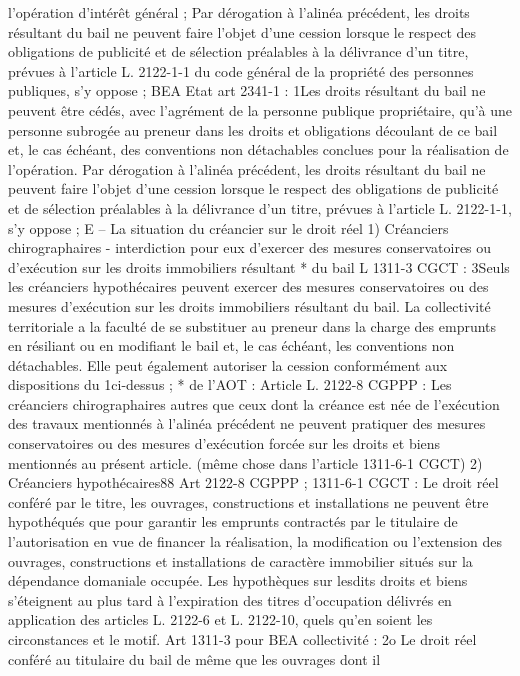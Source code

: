 \documentclass[11pt,a4paper]{report}
\begin{document}
l'opération d'intérêt général ;
Par dérogation à l'alinéa précédent, les droits résultant du bail ne peuvent faire l'objet d'une cession lorsque le
respect des obligations de publicité et de sélection préalables à la délivrance d'un titre, prévues à l'article L.
2122-1-1 du code général de la propriété des personnes publiques, s'y oppose ;
BEA Etat art 2341-1 : 1\degre  Les droits résultant du bail ne peuvent être cédés, avec l'agrément de la
personne publique propriétaire, qu'à une personne subrogée au preneur dans les droits et obligations
découlant de ce bail et, le cas échéant, des conventions non détachables conclues pour la réalisation
de l'opération.
Par dérogation à l'alinéa précédent, les droits résultant du bail ne peuvent faire l'objet d'une cession
lorsque le respect des obligations de publicité et de sélection préalables à la délivrance d'un titre,
prévues à l'article L. 2122-1-1, s'y oppose ;
E – La situation du créancier sur le droit réel
1\degre ) Créanciers chirographaires
- interdiction pour eux d’exercer des mesures conservatoires ou d’exécution sur les droits immobiliers résultant
* du bail L 1311-3 CGCT : 3\degre  Seuls les créanciers hypothécaires peuvent exercer des mesures conservatoires
ou des mesures d'exécution sur les droits immobiliers résultant du bail.
La collectivité territoriale a la faculté de se substituer au preneur dans la charge des emprunts en résiliant ou en
modifiant le bail et, le cas échéant, les conventions non détachables. Elle peut également autoriser la cession
conformément aux dispositions du 1\degre  ci-dessus ;
* de l’AOT : Article L. 2122-8 CGPPP : Les créanciers chirographaires autres que ceux dont la créance est née
de l'exécution des travaux mentionnés à l'alinéa précédent ne peuvent pratiquer des mesures conservatoires ou
des mesures d'exécution forcée sur les droits et biens mentionnés au présent article.
(même chose dans l’article 1311-6-1 CGCT)
2\degre ) Créanciers hypothécaires88
Art 2122-8 CGPPP ; 1311-6-1 CGCT : Le droit réel conféré par le titre, les ouvrages, constructions et
installations ne peuvent être hypothéqués que pour garantir les emprunts contractés par le titulaire de
l'autorisation en vue de financer la réalisation, la modification ou l'extension des ouvrages, constructions et
installations de caractère immobilier situés sur la dépendance domaniale occupée.
Les hypothèques sur lesdits droits et biens s'éteignent au plus tard à l'expiration des titres d'occupation délivrés
en application des articles L. 2122-6 et L. 2122-10, quels qu'en soient les circonstances et le motif.
Art 1311-3 pour BEA collectivité : 2o Le droit réel conféré au titulaire du bail de même que les ouvrages dont il
\end{document}
